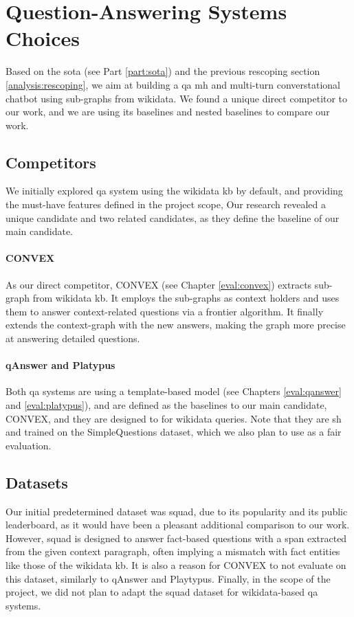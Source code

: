 \section{Question-Answering Systems Choices}
Based on the \gls{sota} (see Part \ref{part:sota}) and the previous rescoping section \ref{analysis:rescoping}, we aim at building a \gls{qa} \gls{mh} and multi-turn converstational chatbot using sub-graphs from \gls{wikidata}. We found a unique direct competitor to our work, and we are using its baselines and nested baselines to compare our work.

\subsection{Competitors}
We initially explored \gls{qa} system using the \gls{wikidata} \gls{kb} by default, and providing the must-have features defined in the project scope, Our research revealed a unique candidate and two related candidates, as they define the baseline of our main candidate.

\paragraph{CONVEX}
As our direct competitor, CONVEX \autocite{paper:convex} (see Chapter \ref{eval:convex}) extracts sub-graph from \gls{wikidata} \gls{kb}. It employs the sub-graphs as context holders and uses them to answer context-related questions via a frontier algorithm. It finally extends the context-graph with the new answers, making the graph more precise at answering detailed questions.

\paragraph{qAnswer and Platypus}
Both \gls{qa} systems are using a template-based model (see Chapters \ref{eval:qanswer} and \ref{eval:platypus}), and are defined as the baselines to our main candidate, CONVEX, and they are designed to for \gls{wikidata} queries. Note that they are \gls{sh} and trained on the SimpleQuestions dataset, which we also plan to use as a fair evaluation.


\subsection{Datasets}
Our initial predetermined dataset was \gls{squad}, due to its popularity and its public leaderboard, as it would have been a pleasant additional comparison to our work. However, \gls{squad} is designed to answer fact-based questions with a span extracted from the given context paragraph, often implying a mismatch with fact entities like those of the \gls{wikidata} \gls{kb}. It is also a reason for CONVEX to not evaluate on this dataset, similarly to qAnswer and Playtypus. Finally, in the scope of the project, we did not plan to adapt the \gls{squad} dataset for \gls{wikidata}-based \gls{qa} systems.

